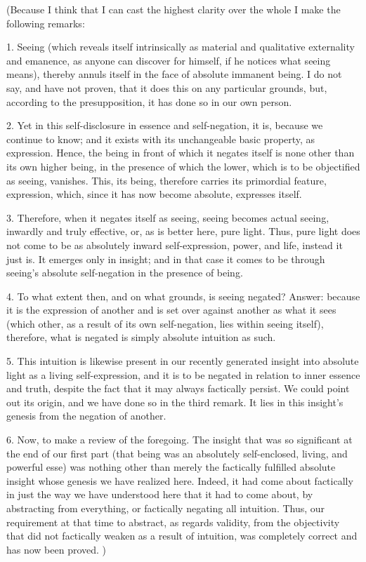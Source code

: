 (Because I think that I can cast
the highest clarity over the whole
I make the following remarks:

1. Seeing
(which reveals itself intrinsically
as material and qualitative externality and emanence,
as anyone can discover for himself,
if he notices what seeing means),
thereby annuls itself in the face
of absolute immanent being.
I do not say, and have not proven,
that it does this on any particular grounds,
but, according to the presupposition,
it has done so in our own person.

2.  Yet in this self-disclosure
in essence and self-negation,
it is, because we continue to know;
and it exists with its unchangeable basic property,
as expression.
Hence, the being in front of which
it negates itself is none other
than its own higher being,
in the presence of which the lower,
which is to be objectified as seeing, vanishes.
This, its being, therefore carries its
primordial feature, expression,
which, since it has now become absolute,
expresses itself.

3. Therefore, when it negates itself as seeing,
seeing becomes actual seeing,
inwardly and truly effective,
or, as is better here, pure light.
Thus, pure light does not come to be as
absolutely inward self-expression, power, and life,
instead it just is.
It emerges only in insight;
and in that case it comes to be
through seeing's absolute self-negation
in the presence of being.

4. To what extent then,
and on what grounds,
is seeing negated?
Answer: because it is the expression of another
and is set over against another as what it sees
(which other, as a result of its own self-negation,
lies within seeing itself),
therefore, what is negated
is simply absolute intuition as such.

5. This intuition is likewise present
in our recently generated insight into
absolute light as a living self-expression,
and it is to be negated in relation to
inner essence and truth,
despite the fact that it may
always factically persist.
We could point out its origin,
and we have done so in the third remark.
It lies in this insight's genesis
from the negation of another.

6. Now, to make a review of the foregoing.
The insight that was so significant
at the end of our first part
(that being was an absolutely
self-enclosed, living, and powerful esse)
was nothing other than merely
the factically fulfilled absolute insight
whose genesis we have realized here.
Indeed, it had come about factically
in just the way we have understood
here that it had to come about,
by abstracting from everything,
or factically negating all intuition.
Thus, our requirement at that time to abstract,
as regards validity, from the objectivity
that did not factically weaken as a result of intuition,
was completely correct and has now been proved.
)

